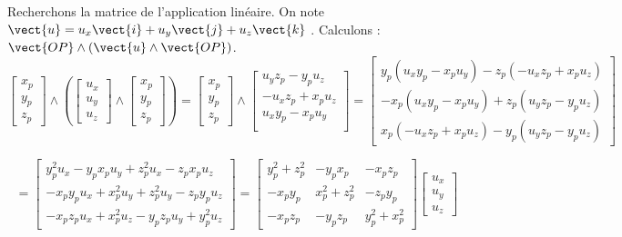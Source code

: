 Recherchons la matrice de l'application linéaire. On note $\vect{u}=u_x\vect{i}+u_y\vect{j}+u_z\vect{k}$ .
Calculons :$\vect{OP}\wedge \left(\vect{u}\wedge \vect{OP}\right)$.
$$
\begin{bmatrix}
x_p \\ y_p \\ z_p
\end{bmatrix}
\wedge
\left(
\begin{bmatrix}
u_x \\ u_y \\ u_z
\end{bmatrix}
\wedge
\begin{bmatrix}
x_p \\ y_p \\ z_p
\end{bmatrix}
\right)
=
\begin{bmatrix}
x_p \\ y_p \\ z_p
\end{bmatrix}
\wedge
\begin{bmatrix}
u_y z_p - y_p u_z \\
-u_x z_p + x_p u_z \\
u_x y_p - x_p u_y \\
\end{bmatrix}
=
\begin{bmatrix}
 y_p \left( u_x y_p - x_p u_y\right)
 -z_p \left( -u_x z_p + x_p u_z \right) \\
 -x_p \left(u_x y_p - x_p u_y \right)
 +z_p \left(u_y z_p - y_p u_z \right) \\
 x_p \left( -u_x z_p + x_p u_z\right)
 -y_p \left( u_y z_p - y_p u_z\right)
\end{bmatrix}
$$

$$
=
\begin{bmatrix}
  y_p^2 u_x  - y_p x_p u_y   +  z_p^2 u_x  -z_p x_p u_z  \\
   -x_p  y_p u_x+x_p^2 u_y  + z_p^2 u_y  - z_p y_p u_z  \\
   -x_p  z_p u_x+ x_p^2 u_z   -y_p  z_pu_y +y_p^2  u_z
\end{bmatrix}
=
\begin{bmatrix}
 y_p^2 +  z_p^2 &  - y_p x_p &      -x_p  z_p   \\
 -x_p  y_p  & x_p^2   + z_p^2   & - z_p y_p   \\
  -x_p  z_p &    -y_p  z_p  & y_p^2  + x_p^2 
\end{bmatrix}
\begin{bmatrix}
u_x \\ u_y \\ u_z
\end{bmatrix}
$$


